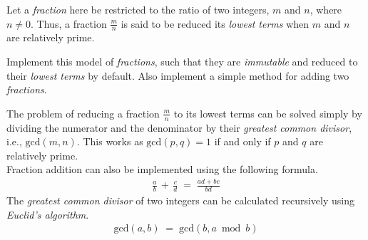 

\problem Let a \textit{fraction} here be restricted to the ratio of two integers, $m$ and $n$, where $n \neq 0$. Thus, a fraction $\frac{m}{n}$ is
said to be reduced its \textit{lowest terms} when $m$ and $n$ are relatively prime.

Implement this model of \textit{fractions}, such that they are \textit{immutable} and reduced to their \textit{lowest terms} by default. Also
implement a simple method for adding two \textit{fractions}.

\solution
The problem of reducing a fraction $\frac{m}{n}$ to its lowest terms can be solved simply by dividing the numerator and the denominator by their
\textit{greatest common divisor}, i.e., $\mathrm{gcd}(m, n)$. This works as $\mathrm{gcd}(p, q) = 1$ if and only if $p$ and $q$ are relatively prime.
\\
Fraction addition can also be implemented using the following formula.
\begin{align*}
	\frac{a}{b} \,+\, \frac{c}{d} \;=\; \frac{ad + bc}{bd}
\end{align*}
The \textit{greatest common divisor} of two integers can be calculated recursively using \textit{Euclid's algorithm}.
\begin{align*}
	\mathrm{gcd}(a, b) \;=\; \mathrm{gcd}(b, a \bmod b)
\end{align*}

